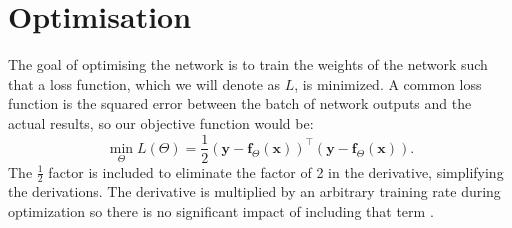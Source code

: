 \documentclass[honours,12pt]{unswthesis}
\numberwithin{equation}{section}
\theoremstyle{definition}
\begin{document}
\section{Optimisation}
The goal of optimising the network is to train the weights of the network such that a loss function, which we will denote as $L$, is minimized. A common loss function is the squared error between the batch of network outputs and the actual results, so our objective function would be:
\[\min_\Theta L(\Theta)=\frac12 (\bm{y}-\bm{f}_\Theta(\bm{x}))^\top(\bm{y}-\bm{f}_\Theta(\bm{x})).\]
The $\frac12$ factor is included to eliminate the factor of 2 in the derivative, simplifying the derivations. The derivative is multiplied by an arbitrary training rate during optimization so there is no significant impact of including that term \citep{DeepLearning}.
\end{document}

